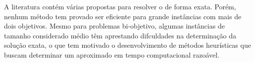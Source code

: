 A literatura contém várias propostas para resolver o \mokp{} de forma exata.
Porém, nenhum método tem provado ser eficiente para grande instâncias
com mais de dois objetivos.
Mesmo para problemas bi-objetivo, algumas instâncias de tamanho considerado
médio têm aprestando difculdades na determinação da solução exata, o que
tem motivado o desenvolvimento de métodos heurísticas que buscam determinar
um \paretoset aproximado em tempo computacional razoável.
